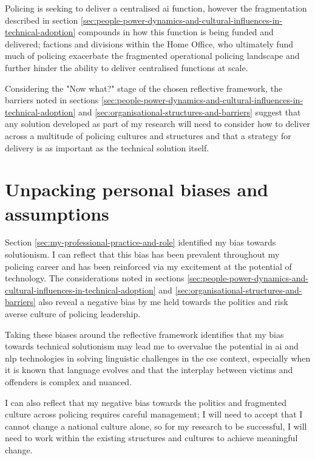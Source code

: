 \documentclass[12pt,a4paper,oneside]{report}
\begin{document}
Policing is seeking to deliver a centralised \gls{ai} function, however the fragmentation described in section \ref{sec:people-power-dynamics-and-cultural-influences-in-technical-adoption} compounds in how this function is being funded and delivered; factions and divisions within the Home Office, who ultimately fund much of policing exacerbate the fragmented operational policing landscape and further hinder the ability to deliver centralised functions at scale.

Considering the "Now what?" stage of the chosen reflective framework, the barriers noted in sections \ref{sec:people-power-dynamics-and-cultural-influences-in-technical-adoption} and \ref{sec:organisational-structures-and-barriers} suggest that any solution developed as part of my research will need to consider how to deliver across a multitude of policing cultures and structures and that a strategy for delivery is as important as the technical solution itself.

\section{Unpacking personal biases and assumptions } 
\label{sec:unpacking-personal-biases-and-assumptions}
Section \ref{sec:my-professional-practice-and-role} identified my bias towards solutionism.  I can reflect that this bias has been prevalent throughout my policing career and has been reinforced via my excitement at the potential of technology.  The considerations noted in sections \ref{sec:people-power-dynamics-and-cultural-influences-in-technical-adoption} and \ref{sec:organisational-structures-and-barriers} also reveal a negative bias by me held towards the politics and risk averse culture of policing leadership.

Taking these biases around the reflective framework identifies that my bias towards technical solutionism may lead me to overvalue the potential in \gls{ai} and \gls{nlp} technologies in solving linguistic challenges in the \gls{cse} context, especially when it is known that language evolves and that the interplay between victims and offenders is complex and nuanced.

I can also reflect that my negative bias towards the politics and fragmented culture across policing requires careful management; I will need to accept that I cannot change a national culture alone, so for my research to be successful, I will need to work within the existing structures and cultures to achieve meaningful change.
\end{document}
